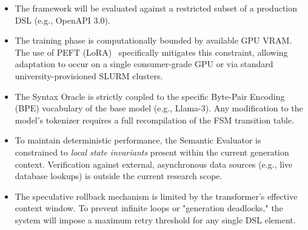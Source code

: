 \begin{itemize}
    \item  
    The framework will be evaluated against a restricted subset of a production DSL 
    (e.g., OpenAPI 3.0).

    \item  
    The training phase is computationally bounded by available GPU VRAM. 
    The use of PEFT (LoRA)~\cite{hu2021lora} specifically mitigates this 
    constraint, allowing adaptation to occur on a single consumer-grade 
    GPU or via standard university-provisioned SLURM clusters.

    \item  The Syntax Oracle is strictly coupled to the specific Byte-Pair Encoding 
    (BPE) vocabulary of the base model (e.g., Llama-3). 
    Any modification to the model's tokenizer requires a full recompilation of 
    the FSM transition table.
    
    \item  
    To maintain deterministic performance, the Semantic Evaluator is 
    constrained to \textit{local state invariants} present within the 
    current generation context. Verification against external, asynchronous 
    data sources (e.g., live database lookups) is outside the current research scope.

    \item  The speculative rollback mechanism is limited by the transformer's 
    effective context window. To prevent infinite loops 
    or "generation deadlocks," the system will impose a maximum retry threshold 
    for any single DSL element.
\end{itemize}